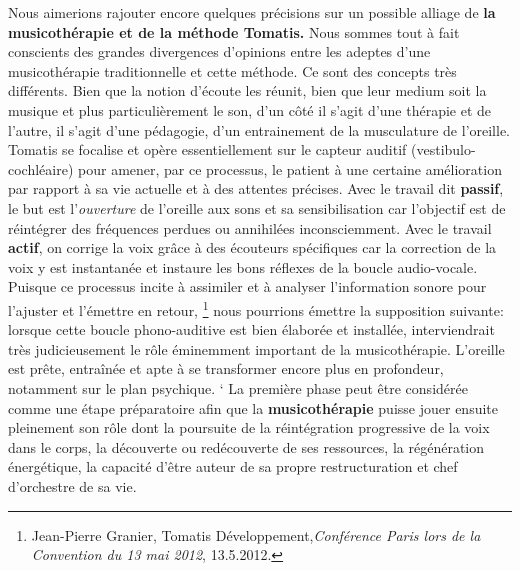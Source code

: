   
 Nous aimerions rajouter encore quelques précisions sur un possible alliage de
\textbf{la musicothérapie et de la méthode Tomatis.} Nous sommes tout à fait conscients des
 grandes divergences d'opinions entre les adeptes d'une musicothérapie
 traditionnelle et cette méthode.
Ce sont des concepts très différents. Bien que la notion d'écoute les réunit, bien que leur medium soit la musique et plus particulièrement le son, d'un côté il s'agit d'une thérapie et de l'autre, il s'agit d'une pédagogie, d'un entrainement de la musculature de l'oreille. 
Tomatis se focalise et opère essentiellement sur le capteur auditif
(vestibulo-cochléaire) pour amener, par ce processus, le patient à une
certaine  amélioration par rapport à sa vie actuelle et à des attentes
précises. %
Avec le travail dit\textbf{ passif}, le  but est l'\emph{ouverture} de l'oreille
aux sons et sa sensibilisation car l'objectif est de réintégrer
des fréquences perdues ou annihilées inconsciemment. 
 Avec le travail \textbf{actif}, on corrige la voix grâce à des écouteurs spécifiques 
car la correction de la voix y est instantanée et instaure les bons
réflexes de la boucle audio-vocale. Puisque ce processus incite à
assimiler et à analyser l'information sonore pour l'ajuster et
l'émettre en retour,%
\footnote{Jean-Pierre Granier, Tomatis 
Développement,\emph{Conférence Paris lors de la Convention du 13 mai 2012}, 13.5.2012.}
nous pourrions émettre la supposition suivante: lorsque cette boucle
phono-auditive est bien élaborée et installée, interviendrait très judicieusement le
rôle éminemment important de la musicothérapie. L'oreille est
prête, entraînée et apte à se transformer encore plus en profondeur, notamment sur le
plan psychique. %
`%
 La première phase peut être considérée comme une étape préparatoire afin que la
 \textbf{musicothérapie} puisse jouer ensuite pleinement son rôle dont
la poursuite de la réintégration progressive de la voix dans
le corps, la découverte ou redécouverte de ses ressources,
la régénération énergétique, la capacité d'être auteur de sa propre
restructuration et chef d'orchestre de sa
vie.

